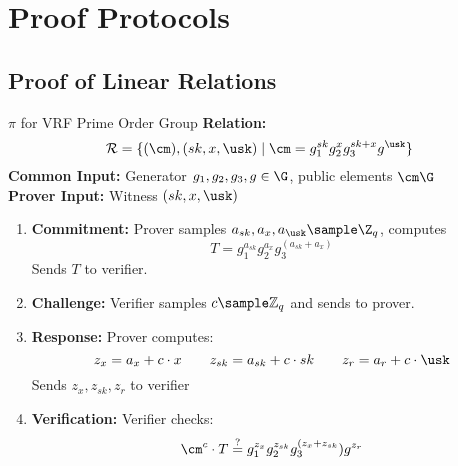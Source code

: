 \section{Proof Protocols}
\subsection{Proof of Linear Relations}

\begin{protocol}{$\pi$ for VRF Prime Order Group}{}\label{pok-linear-relation}
\textbf{Relation: }
\[
\mathcal{R} = \{(\cm), (sk, x, \usk) \mid \cm = g_1^{sk}g_2^{x}g_3^{sk + x}g^{\usk}\}
\]
\textbf{Common Input:} Generator $g_1,g_2,g_3, g \in \G$, public elements $\cm \G$\\
\textbf{Prover Input:} Witness $(sk, x, \usk)$
\begin{enumerate}
    \item \textbf{Commitment:} Prover samples $a_{sk}, a_{x}, a_{\usk} \sample \Z_q$, computes 
    \[
    T = g_1^{a_{sk}}g_2^{a_x} g_3^{(a_{sk} + a_x)} 
    \]
    Sends $T$ to verifier.
    
    \item \textbf{Challenge:} Verifier samples $c \sample \mathbb{Z}_q$ and sends to prover.
    
    \item \textbf{Response:} Prover computes:
    \[
    z_{x} = a_x + c \cdot x \qquad z_{sk} = a_{sk} + c \cdot sk \qquad z_r = a_r + c \cdot \usk
    \]
    Sends $z_{x}, z_{sk}, z_{r}$ to verifier
    
    \item \textbf{Verification:} Verifier checks:
    \[
    \cm^c \cdot T \stackrel{?}{=} g_1^{z_{x}} g_2^{z_{sk}} g_3^{(z_x + z_{sk}}) g^{z_r}
    \]
\end{enumerate}
\end{protocol}
